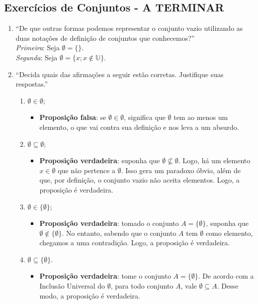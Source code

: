 \documentclass[13pt,letterpaper]{article}
\begin{document}
\subsection{Exercícios de Conjuntos - A TERMINAR} 
\begin{enumerate}
    \item 
        \enquote{De que outras formas podemos representar o conjunto vazio utilizando as duas notações de definição de conjuntos que conhecemos?}
        \\
        \emph{Primeira}: Seja $\emptyset = \{\}$. \\
        \emph{Segunda}: Seja $\emptyset = \{x; x \notin \mathbb{U} \}$.
    \item \enquote{Decida quais das afirmações a seguir estão corretas. Justifique suas respostas.}
    \begin{enumerate}
        \item $\emptyset \in \emptyset$;
        \begin{itemize}
            \item \textbf{Proposição falsa}: se $\emptyset \in \emptyset$, significa que $\emptyset$ tem ao menos um elemento, o que vai contra sua definição e nos leva a um absurdo.
        \end{itemize}
        \item $\emptyset \subseteq \emptyset$;
        \begin{itemize}
            \item \textbf{Proposição verdadeira}: suponha que $\emptyset \nsubseteq \emptyset$. Logo, há um elemento $x \in \emptyset$ que não pertence a $\emptyset$. Isso gera um paradoxo óbvio, além de que, por definição, o conjunto vazio não aceita elementos. Logo, a proposição é verdadeira.
        \end{itemize}
        \item $\emptyset \in \{\emptyset\}$;
        \begin{itemize}
            \item \textbf{Proposição verdadeira}: tomado o conjunto $A = \{\emptyset\}$, suponha que $\emptyset \notin \{\emptyset\}$. No entanto, sabendo que o conjunto $A$ tem $\emptyset$ como elemento, chegamos a uma contradição. Logo, a proposição é verdadeira.
        \end{itemize}
        \item $\emptyset \subseteq \{\emptyset\}$.
        \begin{itemize}
            \item \textbf{Proposição verdadeira}: tome o conjunto $A = \{\emptyset\}$. De acordo com a Inclusão Universal do $\emptyset$, para todo conjunto $A$, vale $\emptyset \subseteq A$. Desse modo, a proposição é verdadeira.

\end{itemize}
\end{enumerate}
\end{enumerate}
\end{document}
